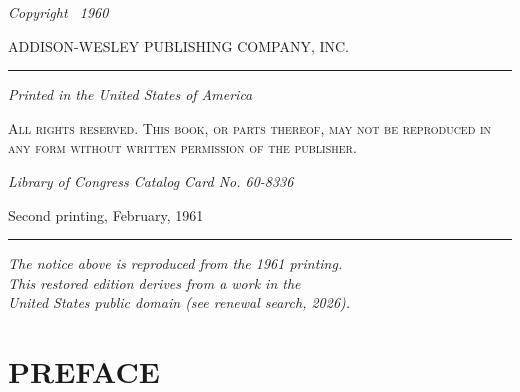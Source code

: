 \documentclass[11pt]{book}
\begin{document}
\thispagestyle{empty}
\null\vspace*{0.22\textheight}
\begin{center}
  {\itshape Copyright \textcopyright\ 1960}\par
  {\normalsize ADDISON-WESLEY PUBLISHING COMPANY, INC.}\par
  \rule{0.30\linewidth}{0.4pt}\par
  {\itshape Printed in the United States of America}\par
  \vspace{1.1em}
  {\footnotesize\textsc{All rights reserved. This book, or parts thereof,
   may not be reproduced in any form without written permission of the
   publisher.}}\par
  \vspace{0.9em}
  {\itshape Library of Congress Catalog Card No. 60-8336}\par
  \vspace{1.4em}
  {\normalsize Second printing, February, 1961}
  \vspace{2.6em}

  \rule{0.30\linewidth}{0.4pt}\par
  \vspace{0.9em}
  {\footnotesize\itshape The notice above is reproduced from the 1961
   printing.\\ This restored edition derives from a work in the\\
   United States public domain (see renewal search, 2026).}
\end{center}
\vfill
\clearpage


\chapter*{\centering\Large PREFACE}
\end{document}
